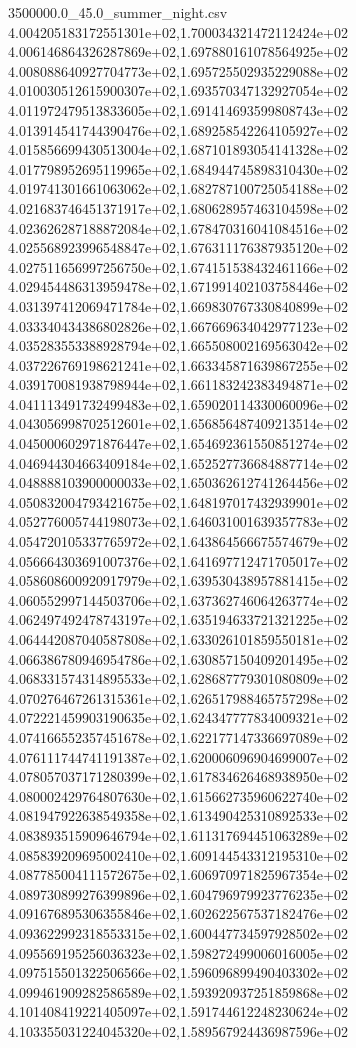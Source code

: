 \begin{filecontents*}{3500000.0_45.0_summer_night.csv}
4.004205183172551301e+02,1.700034321472112424e+02
4.006146864326287869e+02,1.697880161078564925e+02
4.008088640927704773e+02,1.695725502935229088e+02
4.010030512615900307e+02,1.693570347132927054e+02
4.011972479513833605e+02,1.691414693599808743e+02
4.013914541744390476e+02,1.689258542264105927e+02
4.015856699430513004e+02,1.687101893054141328e+02
4.017798952695119965e+02,1.684944745898310430e+02
4.019741301661063062e+02,1.682787100725054188e+02
4.021683746451371917e+02,1.680628957463104598e+02
4.023626287188872084e+02,1.678470316041084516e+02
4.025568923996548847e+02,1.676311176387935120e+02
4.027511656997256750e+02,1.674151538432461166e+02
4.029454486313959478e+02,1.671991402103758446e+02
4.031397412069471784e+02,1.669830767330840899e+02
4.033340434386802826e+02,1.667669634042977123e+02
4.035283553388928794e+02,1.665508002169563042e+02
4.037226769198621241e+02,1.663345871639867255e+02
4.039170081938798944e+02,1.661183242383494871e+02
4.041113491732499483e+02,1.659020114330060096e+02
4.043056998702512601e+02,1.656856487409213514e+02
4.045000602971876447e+02,1.654692361550851274e+02
4.046944304663409184e+02,1.652527736684887714e+02
4.048888103900000033e+02,1.650362612741264456e+02
4.050832004793421675e+02,1.648197017432939901e+02
4.052776005744198073e+02,1.646031001639357783e+02
4.054720105337765972e+02,1.643864566675574679e+02
4.056664303691007376e+02,1.641697712471705017e+02
4.058608600920917979e+02,1.639530438957881415e+02
4.060552997144503706e+02,1.637362746064263774e+02
4.062497492478743197e+02,1.635194633721321225e+02
4.064442087040587808e+02,1.633026101859550181e+02
4.066386780946954786e+02,1.630857150409201495e+02
4.068331574314895533e+02,1.628687779301080809e+02
4.070276467261315361e+02,1.626517988465757298e+02
4.072221459903190635e+02,1.624347777834009321e+02
4.074166552357451678e+02,1.622177147336697089e+02
4.076111744741191387e+02,1.620006096904699007e+02
4.078057037171280399e+02,1.617834626468938950e+02
4.080002429764807630e+02,1.615662735960622740e+02
4.081947922638549358e+02,1.613490425310892533e+02
4.083893515909646794e+02,1.611317694451063289e+02
4.085839209695002410e+02,1.609144543312195310e+02
4.087785004111572675e+02,1.606970971825967354e+02
4.089730899276399896e+02,1.604796979923776235e+02
4.091676895306355846e+02,1.602622567537182476e+02
4.093622992318553315e+02,1.600447734597928502e+02
4.095569195256036323e+02,1.598272499006016005e+02
4.097515501322506566e+02,1.596096899490403302e+02
4.099461909282586589e+02,1.593920937251859868e+02
4.101408419221405097e+02,1.591744612248230624e+02
4.103355031224045320e+02,1.589567924436987596e+02

\end{filecontents*}
